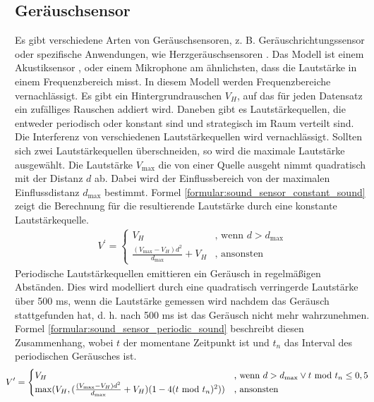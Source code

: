 \subsection{Geräuschsensor}
Es gibt verschiedene Arten von Geräuschsensoren, z. B. Geräuschrichtungssensor \cite{tiete2014soundcompass} oder
spezifische Anwendungen, wie Herzgeräuschsensoren \cite{zhang2016design}.
Das Modell ist einem Akustiksensor \cite{sessler1991acoustic}, oder einem Mikrophone am ähnlichsten,
dass die Lautstärke in einem Frequenzbereich misst.
\newline
\newline
In diesem Modell werden Frequenzbereiche vernachlässigt.
Es gibt ein Hintergrundrauschen $V_H$, auf das für jeden Datensatz ein zufälliges Rauschen addiert wird.
Daneben gibt es Lautstärkequellen, die entweder periodisch oder konstant sind und strategisch im Raum verteilt sind.
Die Interferenz von verschiedenen Lautstärkequellen wird vernachlässigt.
Sollten sich zwei Lautstärkequellen überschneiden, so wird die maximale Lautstärke ausgewählt.
\newline
\newline
Die Lautstärke $V_{\max}$ die von einer Quelle ausgeht nimmt quadratisch mit der Distanz $d$ ab.
Dabei wird der Einflussbereich von der maximalen Einflussdistanz $d_{\max}$ bestimmt.
Formel \ref{formular:sound_sensor_constant_sound} zeigt die Berechnung für die resultierende Lautstärke durch eine konstante Lautstärkequelle.
\begin{align}
    \label{formular:sound_sensor_constant_sound}
    V^{\prime} = \begin{cases}
                     V_H & \text{, wenn } d > d_{\max} \\
                     \frac{(V_{\max} - V_H)d^2}{d_{\max}} + V_H & \text{, ansonsten}
    \end{cases}
\end{align}
Periodische Lautstärkequellen emittieren ein Geräusch in regelmäßigen Abständen.
Dies wird modelliert durch eine quadratisch verringerde Lautstärke über 500 ms,
wenn die Lautstärke gemessen wird nachdem das Geräusch stattgefunden hat,
d. h. nach 500 ms ist das Geräusch nicht mehr wahrzunehmen.
Formel \ref{formular:sound_sensor_periodic_sound} beschreibt diesen Zusammenhang,
wobei $t$ der momentane Zeitpunkt ist und $t_{n}$ das Interval des periodischen Geräusches ist.
\begin{align}
    \label{formular:sound_sensor_periodic_sound}
    \hspace{-0.4cm}
    V^{\prime} = \begin{cases}
                     V_H & \text{, wenn } d > d_{\max} \vee t\ \text{mod}\ t_{n}\leq 0,5 \\
                     \max(V_H, (\frac{(V_{\max} - V_H)d^2}{d_{\max}} + V_H)(1 - 4(t\ \text{mod}\ t_{n})^2)) & \text{, ansonsten}
    \end{cases}
\end{align}

